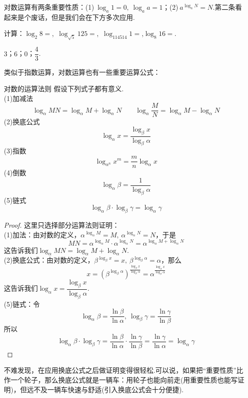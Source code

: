 \documentclass[lang=cn, zihao=5]{elegantbook}
\newcommand{\tk}{\uline{\hspace{4em}}}
\begin{document}
对数运算有两条重要性质：(1)$~\log_{a}{1} = 0,~\log_{a}{a}=1$；(2)$~a^{\log_{a}{N}}=N$.第二条看起来是个废话，但是我们会在下方多次应用.

\begin{example}
	计算：$\log_{2}{8}=$\tk ,~$\log_{\sqrt{5}}{125}=$\tk ,~$\log_{114514}{1}=$\tk ,$\log_{8}{16}=$\tk .
\end{example}
\begin{solution}
	$3$；$6$；$0$；$\dfrac{4}{3}$.
\end{solution}

类似于指数运算，对数运算也有一些重要运算公式：

\begin{proposition}{对数的运算法则}
	假设下列式子都有意义. \\
	(1)加减法$$\log_{\alpha}{MN} = \log_{\alpha}{M} + \log_{\alpha}{N} \qquad \log_{\alpha}{\frac{M}{N}} = \log_{\alpha}{M} - \log_{\alpha}{N}$$
	(2)换底公式$$\log_{\alpha}{x} = \frac{\log_{\beta}{x}}{\log_{\beta}{\alpha}}$$
	(3)指数$$\log_{\alpha ^n}{x^m} = \frac{m}{n} \log_{\alpha}{x}$$
	(4)倒数$$\log_{\alpha}{\beta} = \frac{1}{\log_{\beta}{\alpha}}$$
	(5)链式$$\log_{\alpha}{\beta} \cdot \log_{\beta}{\gamma} = \log_{\alpha}{\gamma}$$
\end{proposition}
\begin{proof}
	这里只选择部分运算法则证明： \\
	(1)加法：由对数的定义，$\alpha ^{\log_{\alpha}{M}} = M,~\alpha ^{\log_{\alpha}{N}} = N$，于是$$MN = \alpha ^{\log_{\alpha}{M}} \cdot \alpha ^{\log_{\alpha}{N}} = \alpha ^{\log_{\alpha}{M} + \log_{\alpha}{N}}$$
	这告诉我们$\log_{\alpha}{MN} = \log_{\alpha}{M} + \log_{\alpha}{N}$. \\
	(2)换底公式：由对数的定义，$\beta ^{\log_{\beta}{x}} = x,~\beta ^{\log_{\beta}{\alpha}} = \alpha$，那么$$x = (\beta ^{\log_{\beta}{\alpha}})^{\frac{\log_{\beta}{x}}{\log_{\beta}{\alpha}}} = \alpha ^{\frac{\log_{\beta}{x}}{\log_{\beta}{\alpha}}}$$
	这告诉我们$\log_{\alpha}{x} = \dfrac{\log_{\beta}{x}}{\log_{\beta}{\alpha}}$. \\
	(5)链式：令$$\log_{\alpha}{\beta} = \frac{\ln{\beta}}{\ln{\alpha}},~ \log_{\beta}{\gamma} = \frac{\ln{\gamma}}{\ln{\beta}}$$
	所以$$\log_{\alpha}{\beta} \cdot \log_{\beta}{\gamma} = \frac{\ln{\beta}}{\ln{\alpha}} \cdot \frac{\ln{\gamma}}{\ln{\beta}} = \frac{\ln{\gamma}}{\ln{\alpha}} = \log_{\alpha}{\gamma}$$
\end{proof}
\begin{remark}
	不难发现，在应用换底公式之后做证明变得很轻松.可以说，如果把“重要性质”比作一个轮子，那么换底公式就是一辆车：用轮子也能向前走(用重要性质也能写证明)，但远不及一辆车快速与舒适(引入换底公式会十分便捷).
\end{remark}
\end{document}
